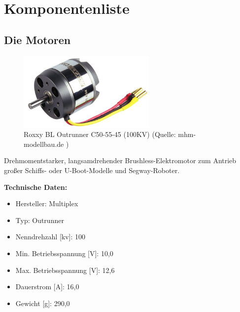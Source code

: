 \newpage
\renewcommand{\autoren}{Gesamtes Team}
\section{Komponentenliste}
\subsection{Die Motoren}
\begin{figure}[!h]  %
	\centering\includegraphics[width=0.6\textwidth]{images/Motor.jpg}
	\caption{Roxxy BL Outrunner C50-55-45 (100KV) \newline (Quelle: mhm-modellbau.de )}
	\label{Motor Roxxy}
\end{figure}
Drehmomentstarker, langsamdrehender Brushless-Elektromotor zum Antrieb großer Schiffs- oder U-Boot-Modelle und Segway-Roboter.

\textbf{Technische Daten:} 
\begin{itemize} 
	\item Hersteller: Multiplex 
	\item Typ: Outrunner
	\item Nenndrehzahl [kv]: 100
	\item Min. Betriebsspannung [V]: 10,0
	\item Max. Betriebsspannung [V]: 12,6
	\item Dauerstrom [A]: 16,0
	\item Gewicht [g]: 290,0
\end{itemize}
\pagebreak
